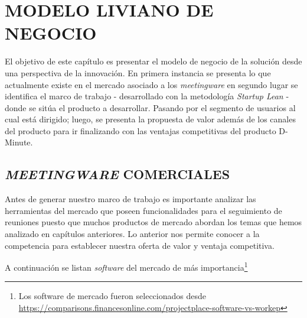 \section{MODELO LIVIANO DE NEGOCIO}

El objetivo de este capítulo es presentar el modelo de negocio de la solución desde una perspectiva de la innovación. En primera instancia se presenta lo que actualmente existe en el mercado asociado a los \textit{meetingware} en segundo lugar se identifica el marco de trabajo - desarrollado con la metodología \textit{Startup Lean} - donde se sitúa el producto a desarrollar. Pasando por el segmento de usuarios al cual está dirigido; luego, se presenta la propuesta de valor además de los canales del producto para ir finalizando con las ventajas competitivas del producto D-Minute.

\subsection{\textit{MEETINGWARE} COMERCIALES}

Antes de generar nuestro marco de trabajo es importante analizar las herramientas del mercado que poseen funcionalidades para el seguimiento de reuniones puesto que muchos productos de mercado abordan los temas que hemos analizado en capítulos anteriores. Lo anterior nos permite conocer a la competencia para establecer nuestra oferta de valor y ventaja competitiva.

A continuación se listan \textit{software} del mercado de más importancia\footnote{Los software de mercado fueron seleccionados desde \url{https://comparisons.financesonline.com/projectplace-software-vs-workep}}


